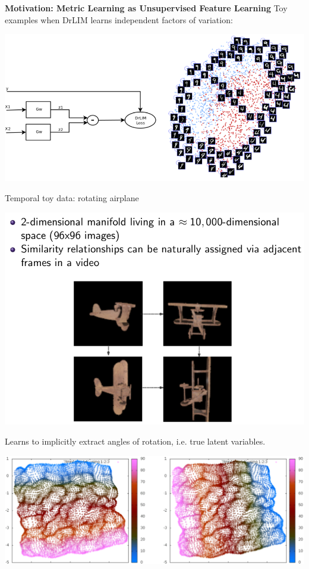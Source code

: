 \documentclass[12pt,a4paper]{report}
\begin{document}
\noindent 
{\bf Motivation: Metric Learning as Unsupervised Feature Learning} 
Toy examples when DrLIM learns independent factors of variation:  
\begin{center}
\includegraphics[scale=0.4]{drlim_mnist.png}
\end{center} 
\newpage
Temporal toy data: rotating airplane 
\begin{center}
\includegraphics[scale=0.4]{drlim_data.png}
\end{center} 
Learns to implicitly extract angles of rotation, i.e. true latent variables.  
\begin{center}
\includegraphics[scale=0.3]{drlim_result.png}
\end{center}
\newpage 
\end{document}
